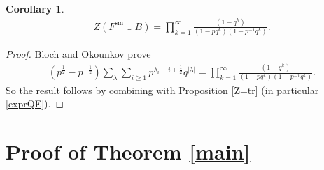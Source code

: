 \documentclass{amsart}
\newtheorem{corollary}[theorem]{Corollary}
\theoremstyle{definition}
\newcommand{\sm}{\mathrm{sm}}
\begin{document}

\begin{corollary} \label{BO}
\begin{align*} 
Z(F^{\sm} \cup B) = \prod_{k=1}^{\infty} \frac{(1-q^k)}{(1-p q^k)(1-p^{-1} q^k)}.
\end{align*}
\end{corollary}
\begin{proof}
Bloch and Okounkov prove \cite{BO}
\begin{align*} 
(p^{\frac{1}{2}} - p^{-\frac{1}{2}}) \sum_{\lambda} \sum_{i \geq 1} p^{\lambda_i-i+\frac{1}{2}} q^{|\lambda|} = \prod_{k=1}^{\infty} \frac{(1-q^k)}{(1-p q^k)(1-p^{-1} q^k)}.
\end{align*}
So the result follows by combining with Proposition \ref{Z=tr} (in particular \eqref{exprQE}).
\end{proof}



\section{Proof of Theorem \ref{main}}
\end{document}
